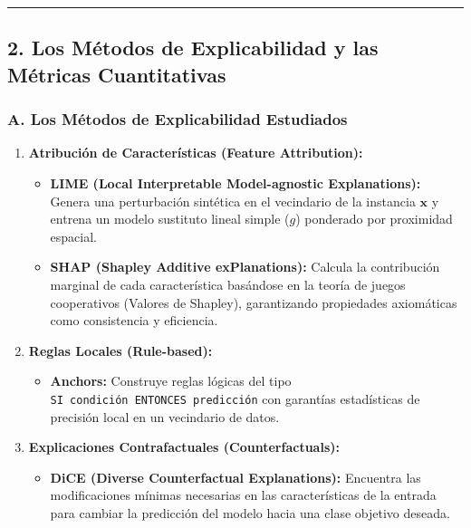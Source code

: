 \documentclass[
]{article}
\providecommand{\tightlist}{%
  \setlength{\itemsep}{0pt}\setlength{\parskip}{0pt}}
\begin{document}
\begin{center}\rule{0.5\linewidth}{0.5pt}\end{center}

\subsection{2. Los Métodos de Explicabilidad y las Métricas
Cuantitativas}\label{los-muxe9todos-de-explicabilidad-y-las-muxe9tricas-cuantitativas}

\subsubsection{A. Los Métodos de Explicabilidad
Estudiados}\label{a.-los-muxe9todos-de-explicabilidad-estudiados}

\begin{enumerate}
\def\labelenumi{\arabic{enumi}.}
\tightlist
\item
  \textbf{Atribución de Características (Feature Attribution):}

  \begin{itemize}
  \tightlist
  \item
    \textbf{LIME (Local Interpretable Model-agnostic Explanations):}
    Genera una perturbación sintética en el vecindario de la instancia
    \(\mathbf{x}\) y entrena un modelo sustituto lineal simple (\(g\))
    ponderado por proximidad espacial.
  \item
    \textbf{SHAP (Shapley Additive exPlanations):} Calcula la
    contribución marginal de cada característica basándose en la teoría
    de juegos cooperativos (Valores de Shapley), garantizando
    propiedades axiomáticas como consistencia y eficiencia.
  \end{itemize}
\item
  \textbf{Reglas Locales (Rule-based):}

  \begin{itemize}
  \tightlist
  \item
    \textbf{Anchors:} Construye reglas lógicas del tipo
    \texttt{SI\ condición\ ENTONCES\ predicción} con garantías
    estadísticas de precisión local en un vecindario de datos.
  \end{itemize}
\item
  \textbf{Explicaciones Contrafactuales (Counterfactuals):}

  \begin{itemize}
  \tightlist
  \item
    \textbf{DiCE (Diverse Counterfactual Explanations):} Encuentra las
    modificaciones mínimas necesarias en las características de la
    entrada para cambiar la predicción del modelo hacia una clase
    objetivo deseada.
  \end{itemize}
\end{enumerate}
\end{document}
